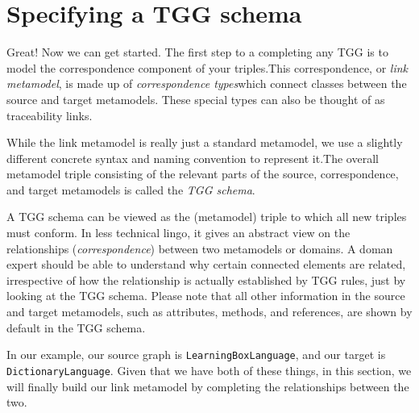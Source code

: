 \newpage
\hypertarget{TGGSchema}{}
\section{Specifying a TGG schema}
\genHeader

Great! Now we can get started. The first step to a completing any TGG is to model the correspondence component of your triples.This
correspondence, or \emph{link metamodel}, is made up of \emph{correspondence types}which connect classes between the source and
target metamodels. These special types can also be thought of as traceability links.

While the link metamodel is really just a standard metamodel, we use a slightly different concrete syntax and naming convention to represent it.The overall metamodel triple consisting of the relevant parts of the source, correspondence, and target metamodels is called the \emph{TGG schema}.

A TGG schema can be viewed as the (metamodel) triple to which all new triples must conform. In less technical lingo, it gives an abstract view on the
relationships (\emph{correspondence}) between two metamodels or domains. A doman expert should be able to understand why certain connected elements are related,
irrespective of how the relationship is actually established by TGG rules, just by looking at the TGG schema. Please note that all other information in the
source and target metamodels, such as attributes, methods, and references, are shown by default in the TGG schema.

In our example, our source graph is \texttt{LearningBoxLanguage}, and our target is \texttt{DictionaryLanguage}. Given that we have both of these things, in
this section, we will finally build our link metamodel by completing the relationships between the two.





